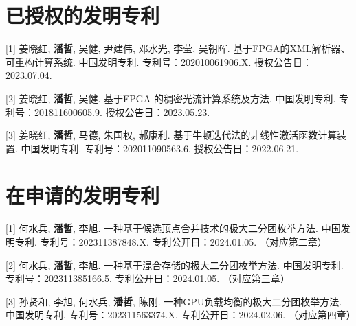 \section*{已授权的发明专利}

[1] 姜晓红, \textbf{潘哲}, 吴健, 尹建伟, 邓水光, 李莹, 吴朝晖. 基于FPGA的XML解析器、可重构计算系统. 中国发明专利. 专利号：202010061906.X. 授权公告日：2023.07.04.

[2] 姜晓红, \textbf{潘哲}, 吴健. 基于FPGA 的稠密光流计算系统及方法. 中国发明专利. 专利号：201811600605.9. 授权公告日：2023.05.23.

[3] 姜晓红, \textbf{潘哲}, 马德, 朱国权, 郝康利. 基于牛顿迭代法的非线性激活函数计算装置. 中国发明专利. 专利号：202011090563.6. 授权公告日：2022.06.21.

\section*{在申请的发明专利}

[1] 何水兵, \textbf{潘哲}, 李旭. 一种基于候选顶点合并技术的极大二分团枚举方法. 中国发明专利. 专利号：202311387848.X. 专利公开日：2024.01.05. （对应第二章）

[2] 何水兵, \textbf{潘哲}, 李旭. 一种基于混合存储的极大二分团枚举方法. 中国发明专利. 专利号：202311385166.5. 专利公开日：2024.01.05. （对应第三章）

[3] 孙贤和, 李旭, 何水兵, \textbf{潘哲}, 陈刚. 一种GPU负载均衡的极大二分团枚举方法. 中国发明专利. 专利号：202311563374.X. 专利公开日：2024.02.06. （对应第四章）



